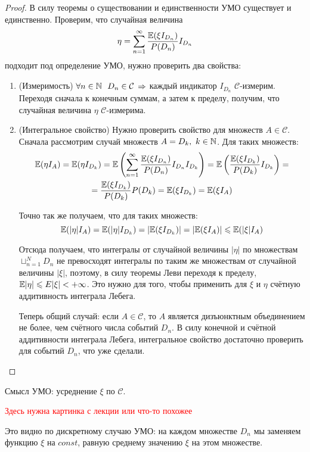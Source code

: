 \begin{proof}
    В силу теоремы о существовании и единственности УМО существует и единственно. Проверим, что случайная величина
    \[
        \eta = \sum_{n=1}^{\infty} \frac{\mathbb{E}(\xi I_{D_n})}{P(D_n)} I_{D_n}
    \]
    подходит под определение УМО, нужно проверить два свойства:
    \begin{enumerate}
        \item (Измеримость) $\forall n \in \mathbb{N} \ \ D_n \in \mathcal{C}$ $\Rightarrow$ каждый индикатор $I_{D_n}$ $\mathcal{C}$-измерим. Переходя сначала к конечным суммам, а затем к пределу, получим, что случайная величина $\eta$ $\mathcal{C}$-измерима.

        \item (Интегральное свойство) Нужно проверить свойство для множеств $A \in \mathcal{C}$. Сначала рассмотрим случай множеств $A = D_k,\ k \in \N$. Для таких множеств:
        \begin{multline*}
            \mathbb{E}(\eta I_A) = \mathbb{E}(\eta I_{D_k}) = \mathbb{E} \left( \sum_{n=1}^{\infty} \frac{\mathbb{E}(\xi I_{D_n})}{P(D_n)} I_{D_n} I_{D_k} \right) = \mathbb{E} \left(\frac{\mathbb{E}(\xi I_{D_k})}{P(D_k)} I_{D_k} \right) =
            \\
            = \frac{\mathbb{E}(\xi I_{D_k})}{P(D_k)} P(D_k) = \mathbb{E}(\xi I_{D_k}) = \mathbb{E}(\xi I_A)
        \end{multline*}

        Точно так же получаем, что для таких множеств:
        \[
            \mathbb{E}(|\eta| I_A) = \mathbb{E}(|\eta| I_{D_k}) = |\mathbb{E}(\xi I_{D_k})| = |\mathbb{E}(\xi I_A)| \leqslant \mathbb{E}(|\xi| I_A)
        \]
        
        Отсюда получаем, что интегралы от случайной величины $|\eta|$ по множествам $\sqcup_{n=1}^{N} D_n$ не превосходят интегралы по таким же множествам от случайной величины $|\xi|$, поэтому, в силу теоремы Леви переходя к пределу, $\mathbb{E}|\eta| \leqslant E|\xi| < +\infty$. Это нужно для того, чтобы применить для $\xi$ и $\eta$ счётную аддитивность интеграла Лебега.

        Теперь общий случай: если $A \in \mathcal{C}$, то $A$ является дизъюнктным объединением не более, чем счётного числа событий $D_n$. В силу конечной и счётной аддитивности интеграла Лебега, интегральное свойство достаточно проверить для событий $D_n$, что уже сделали.
    \end{enumerate}
\end{proof}

\begin{note}
    Смысл УМО: усреднение $\xi$ по $\mathcal{C}$.

    \textcolor{red}{Здесь нужна картинка с лекции или что-то похожее}

    Это видно по дискретному случаю УМО: на каждом множестве $D_n$ мы заменяем функцию $\xi$ на $const$, равную среднему значению $\xi$ на этом множестве.
\end{note}